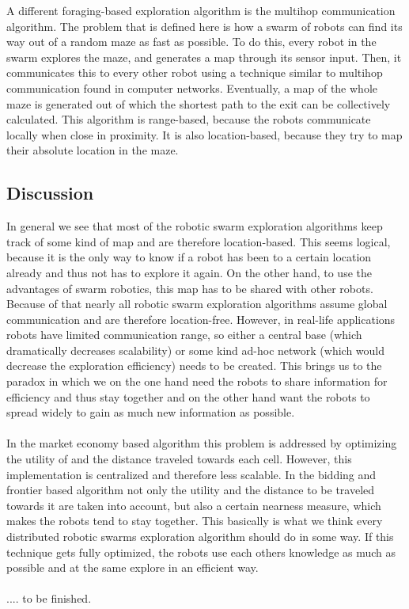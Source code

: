 	A different foraging-based exploration algorithm is the multihop communication algorithm. \cite{jung2010multi}
	The problem that is defined here is how a swarm of robots can find its way out of a random maze as fast as possible.
	To do this, every robot in the swarm explores the maze, and generates a map through its sensor input.
	Then, it communicates this to every other robot using a technique similar to multihop communication found in computer networks.
	Eventually, a map of the whole maze is generated out of which the shortest path to the exit can be collectively calculated.
	This algorithm is range-based, because the robots communicate locally when close in proximity.
	It is also location-based, because they try to map their absolute location in the maze. 


	
\subsection{Discussion}
	In general we see that most of the robotic swarm exploration algorithms keep track of some kind of map and are therefore location-based.
	This seems logical, because it is the only way to know if a robot has been to a certain location already and thus not has to explore it again.
	On the other hand, to use the advantages of swarm robotics, this map has to be shared with other robots.
	Because of that nearly all robotic swarm exploration algorithms assume global communication and are therefore location-free.
	However, in real-life applications robots have limited communication range, so either a central base (which dramatically decreases scalability) or some kind ad-hoc network (which would decrease the exploration efficiency) needs to be created.
	This brings us to the paradox in which we on the one hand need the robots to share information for efficiency and thus stay together and on the other hand want the robots to spread widely to gain as much new information as possible.\\
	\\
	In the market economy based algorithm this problem is addressed by optimizing the utility of and the distance traveled towards each cell. However, this implementation is centralized and therefore less scalable. In the bidding and frontier based algorithm not only the utility and the distance to be traveled towards it are taken into account, but also a certain nearness measure, which makes the robots tend to stay together. This basically is what we think every distributed robotic swarms exploration algorithm should do in some way. If this technique gets fully optimized, the robots use each others knowledge as much as possible and at the same explore in an efficient way.\\
	\\
	.... to be finished.


